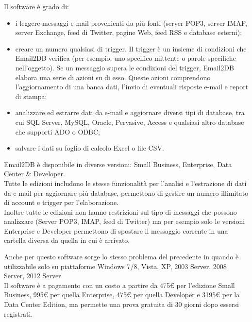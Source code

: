 Il software è grado di:
\begin{itemize}
\item i leggere messaggi e-mail provenienti da più fonti (server POP3, server IMAP, server Exchange, feed di Twitter, pagine Web, feed RSS e database esterni);
\item creare un numero qualsiasi di trigger. Il trigger è un insieme di condizioni che Email2DB verifica (per esempio, uno specifico mittente o parole specifiche nell'oggetto). Se un messaggio supera le condizioni del trigger, Email2DB elabora una serie di azioni su di esso. Queste azioni comprendono l'aggiornamento di una banca dati, l'invio di eventuali risposte e-mail e report di stampa;
\item analizzare ed estrarre dati da e-mail e aggiornare diversi tipi di database, tra cui SQL Server, MySQL, Oracle, Pervasive, Access e qualsiasi altro database che supporti ADO o ODBC;
\item salvare i dati su foglio di calcolo Excel o file CSV.
\end{itemize}

Email2DB è disponibile in diverse versioni: Small Business, Enterprise, Data Center \& Developer.\\
Tutte le edizioni includono le stesse funzionalità per l'analisi e l'estrazione di dati da e-mail per aggiornare più database, permettono di gestire un numero illimitato di account e trigger per l'elaborazione.\\
Inoltre tutte le edizioni non hanno restrizioni sul tipo di messaggi che possono analizzare (Server POP3, IMAP, feed di Twitter) ma per esempio solo le versioni Enterprise e Developer permettono di spostare il messaggio corrente in una cartella diversa da quella in cui è arrivato.

Anche per questo software sorge lo stesso problema del precedente in quando è utilizzabile solo su piattaforme Windows 7/8, Vista, XP, 2003 Server, 2008 Server, 2012 Server.\\
Il software è a pagamento con un costo a partire da 475\euro{} per l'edizione Small Business, 995\euro{} per quella Enterprise, 475\euro{} per quella Developer e 3195\euro{} per la Data Center Edition, ma permette una prova gratuita di 30 giorni dopo essersi registrati.

